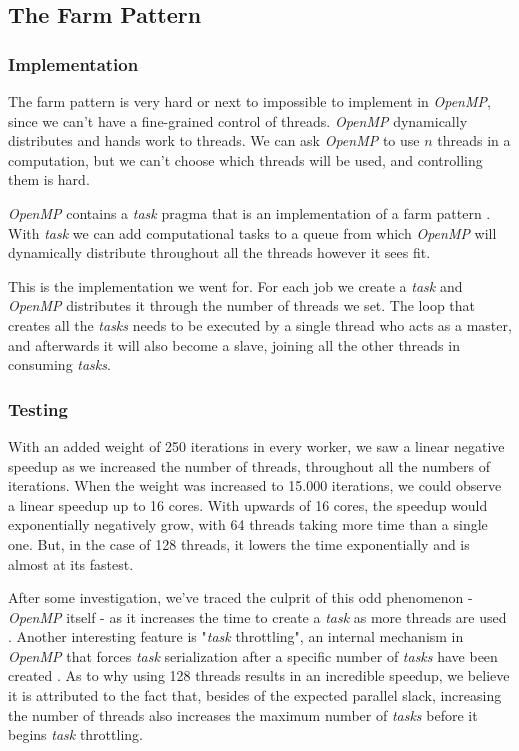 \documentclass[10pt,journal]{IEEEtran}
\begin{document}
\subsection{The Farm Pattern}
\subsubsection{Implementation}

The farm pattern is very hard or next to impossible to implement in \textit{OpenMP}, since we can't have a fine-grained control of threads. \textit{OpenMP} dynamically distributes and hands work to threads. We can ask \textit{OpenMP} to use $ n $ threads in a computation, but we can't choose which threads will be used, and controlling them is hard.

\textit{OpenMP} contains a \textit{task} pragma that is an implementation of a farm pattern \cite{jlfarm}. With \textit{task} we can add computational tasks to a queue from which \textit{OpenMP} will dynamically distribute throughout all the threads however it sees fit.

This is the implementation we went for. For each job we create a \textit{task} and \textit{OpenMP} distributes it through the number of threads we set. The loop that creates all the \textit{tasks} needs to be executed by a single thread who acts as a master, and afterwards it will also become a slave, joining all the other threads in consuming \textit{tasks}.

\subsubsection{Testing}

With an added weight of 250 iterations in every worker, we saw a linear negative speedup as we increased the number of threads, throughout all the numbers of iterations. When the weight was increased to 15.000 iterations, we could observe a linear speedup up to 16 cores. With upwards of 16 cores, the speedup would exponentially negatively grow, with 64 threads taking more time than a single one. But, in the case of 128 threads, it lowers the time exponentially and is almost at its fastest.

After some investigation, we've traced the culprit of this odd phenomenon - \textit{OpenMP} itself - as it increases the time to create a \textit{task} as more threads are used \cite{granularity}. Another interesting feature is "\textit{task} throttling", an internal mechanism in \textit{OpenMP} that forces \textit{task} serialization after a specific number of \textit{tasks} have been created \cite{granularity}. As to why using 128 threads results in an incredible speedup, we believe it is attributed to the fact that, besides of the expected parallel slack, increasing the number of threads also increases the maximum number of \textit{tasks} before it begins \textit{task} throttling.
\end{document}
